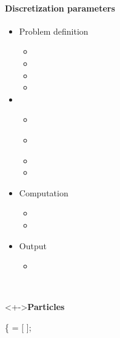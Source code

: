 
\begin{frame}[fragile] 
\secframetitle{\ssParameters}
\framesubtitle{Discretization parameters}
\vspace{-0.2in}
\begin{minipage}[t]{1.7in}
\begin{itemize}
\item Problem definition
  \begin{itemize}
  \item {}
  \item {}
  \item {}
  \item {}
  \end{itemize}
\item {}
  \begin{itemize}
  \item \textcolor{green!50!black}{}
  \item \textcolor{green!50!black}{}
  \item {}
  \item {}
  \end{itemize}
\item Computation
  \begin{itemize}
  \item {}
  \item {}
  \end{itemize}
\item Output
  \begin{itemize}
    \item {}
  \end{itemize}
\end{itemize}
\end{minipage} \
\begin{minipage}[t]{2.6in}
\vspace{-0.2in}
  \begin{block}<+->{\textbf{Particles}}
  \footnotesize \vspace{-0.1in}
\begin{semiverbatim}
 \{
    = [  ];


\end{semiverbatim}
\end{block}
\end{minipage}
\end{frame}
